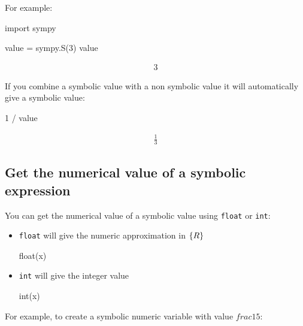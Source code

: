 \begin{pyin}
For example:




\begin{pyin}
import sympy

value = sympy.S(3)
value
\end{pyin}




\begin{equation*}
\begin{split}\displaystyle 3\end{split}
\end{equation*}

If you combine a symbolic value with a non symbolic value it will automatically
give a symbolic value:

\begin{pyin}
1 / value
\end{pyin}

\begin{equation*}
\begin{split}\displaystyle \frac{1}{3}\end{split}
\end{equation*}

\subsection{Get the numerical value of a symbolic expression}
\label{\detokenize{tools-for-mathematics/02-algebra/how/main:how-to-get-the-numerical-value-of-a-symbolic-expression}}

You can get the numerical value of a symbolic value using \texttt{float} or
\texttt{int}:
\begin{itemize}
\item 

\texttt{float} will give the numeric approximation in \(\mathbb\{R\}\)

\begin{pyin}
float(x)
\end{pyin}

\item 

\texttt{int} will give the integer value

\begin{pyin}
int(x)
\end{pyin}

\end{itemize}


For example, to create a symbolic numeric variable with value
\(frac{1}{5}\):


\end{pyin}
